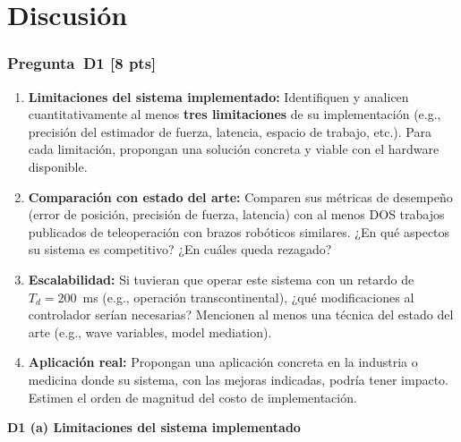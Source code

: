 \documentclass[journal,10pt,twoside]{IEEEtran}
\newcommand{\pts}[1]{\textbf{\color{tec_red}[#1 pts]}}
\begin{document}
\section{Discusión}
\label{sec:discussion}

\subsubsection*{Pregunta~D1 \pts{8}}
\begin{enumerate}[label=(\alph*)]
  \item \textbf{Limitaciones del sistema implementado:}
        Identifiquen y analicen cuantitativamente al menos \textbf{tres
        limitaciones} de su implementación (e.g., precisión del
        estimador de fuerza, latencia, espacio de trabajo, etc.).
        Para cada limitación, propongan una solución concreta y
        viable con el hardware disponible.
  \item \textbf{Comparación con estado del arte:}
        Comparen sus métricas de desempeño (error de posición,
        precisión de fuerza, latencia) con al menos DOS trabajos
        publicados de teleoperación con brazos robóticos similares.
        ¿En qué aspectos su sistema es competitivo? ¿En cuáles
        queda rezagado?
  \item \textbf{Escalabilidad:} Si tuvieran que operar este sistema
        con un retardo de $T_d = 200$~ms (e.g., operación
        transcontinental), ¿qué modificaciones al controlador
        serían necesarias? Mencionen al menos una técnica
        del estado del arte (e.g., wave variables, model mediation).
  \item \textbf{Aplicación real:} Propongan una aplicación concreta
        en la industria o medicina donde su sistema, con las mejoras
        indicadas, podría tener impacto. Estimen el orden de magnitud
        del costo de implementación.
\end{enumerate}

\textbf{D1 (a) Limitaciones del sistema implementado}
\end{document}
